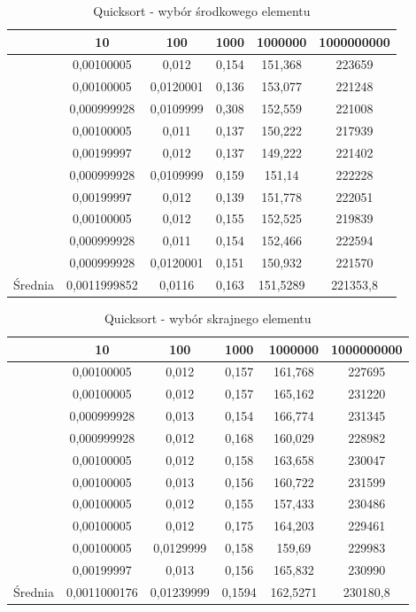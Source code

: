 \documentclass[10pt, a4paper]{article}
\begin{document}
\begin{flushleft}
\begin{table}[h]
\centering
\caption{Quicksort - wybór środkowego elementu}
\begin{tabular}{|c|c|c|c|c|c|} \hline
& 10 & 100 & 1000 & 1000000 & 1000000000 \\ \hline
& 0,00100005 & 0,012 & 0,154 & 151,368 & 223659 \\
& 0,00100005 & 0,0120001 & 0,136 & 153,077 & 221248 \\
& 0,000999928 & 0,0109999 & 0,308 & 152,559  & 221008 \\
& 0,00100005 & 0,011 & 0,137 & 150,222 & 217939 \\
& 0,00199997 & 0,012 & 0,137 & 149,222 & 221402 \\
& 0,000999928 & 0,0109999 & 0,159 & 151,14 & 222228 \\
& 0,00199997 & 0,012 & 0,139 & 151,778 & 222051 \\
& 0,00100005 & 0,012 & 0,155 & 152,525 & 219839 \\
& 0,000999928 & 0,011 & 0,154 & 152,466 & 222594 \\
& 0,000999928 & 0,0120001 & 0,151 & 150,932 & 221570 \\ \hline
Średnia & 0,0011999852 & 0,0116 & 0,163 & 151,5289 & 221353,8 \\ \hline
\end{tabular}
\end{table}

\begin{table}[h]
\centering
\caption{Quicksort - wybór skrajnego elementu}
\begin{tabular}{|c|c|c|c|c|c|} \hline
& 10 & 100 & 1000 & 1000000 & 1000000000 \\ \hline
& 0,00100005 & 0,012 & 0,157 & 161,768 & 227695 \\
& 0,00100005 & 0,012 & 0,157 & 165,162 & 231220 \\
& 0,000999928 & 0,013 & 0,154 & 166,774 & 231345 \\
& 0,000999928 & 0,012 & 0,168 & 160,029 & 228982 \\
& 0,00100005 & 0,012 & 0,158 & 163,658 & 230047 \\
& 0,00100005 & 0,013 & 0,156 & 160,722 & 231599 \\
& 0,00100005 & 0,012 & 0,155 & 157,433 & 230486 \\
& 0,00100005 & 0,012 & 0,175 & 164,203 & 229461 \\
& 0,00100005 & 0,0129999 & 0,158 & 159,69 & 229983 \\
& 0,00199997 & 0,013 & 0,156 & 165,832 & 230990 \\ \hline
Średnia & 0,0011000176 & 0,01239999 & 0,1594 & 162,5271 & 230180,8 \\ \hline
\end{tabular}
\end{table}


\end{flushleft}
\end{document}
